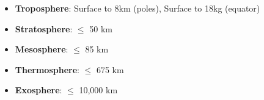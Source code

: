             \begin{itemize}
                \item \textbf{Troposphere}: Surface to 8km (poles), Surface to 18kg (equator)
                \item \textbf{Stratosphere}: $\leq$ 50 km
                \item \textbf{Mesosphere}: $\leq$ 85 km
                \item \textbf{Thermosphere}: $\leq$ 675 km
                \item \textbf{Exosphere}: $\leq$ 10,000 km 
            \end{itemize}

